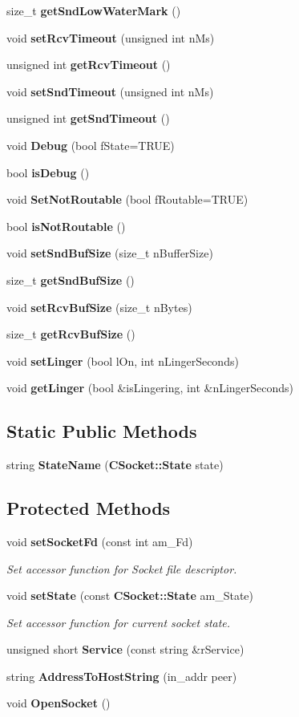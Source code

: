 \begin{CompactItemize}
size\_\-t {\bf get\-Snd\-Low\-Water\-Mark} ()
\item 
void {\bf set\-Rcv\-Timeout} (unsigned int n\-Ms)
\item 
unsigned int {\bf get\-Rcv\-Timeout} ()
\item 
void {\bf set\-Snd\-Timeout} (unsigned int n\-Ms)
\item 
unsigned int {\bf get\-Snd\-Timeout} ()
\item 
void {\bf Debug} (bool f\-State=TRUE)
\item 
bool {\bf is\-Debug} ()
\item 
void {\bf Set\-Not\-Routable} (bool f\-Routable=TRUE)
\item 
bool {\bf is\-Not\-Routable} ()
\item 
void {\bf set\-Snd\-Buf\-Size} (size\_\-t n\-Buffer\-Size)
\item 
size\_\-t {\bf get\-Snd\-Buf\-Size} ()
\item 
void {\bf set\-Rcv\-Buf\-Size} (size\_\-t n\-Bytes)
\item 
size\_\-t {\bf get\-Rcv\-Buf\-Size} ()
\item 
void {\bf set\-Linger} (bool l\-On, int n\-Linger\-Seconds)
\item 
void {\bf get\-Linger} (bool \&is\-Lingering, int \&n\-Linger\-Seconds)
\end{CompactItemize}
\subsection*{Static Public Methods}
\begin{CompactItemize}
\item 
string {\bf State\-Name} ({\bf CSocket::State} state)
\end{CompactItemize}
\subsection*{Protected Methods}
\begin{CompactItemize}
\item 
void {\bf set\-Socket\-Fd} (const int am\_\-Fd)
\begin{CompactList}\small\item\em Set accessor function for Socket file descriptor.\item\end{CompactList}\item 
void {\bf set\-State} (const {\bf CSocket::State} am\_\-State)
\begin{CompactList}\small\item\em Set accessor function for current socket state.\item\end{CompactList}\item 
unsigned short {\bf Service} (const string \&r\-Service)
\item 
string {\bf Address\-To\-Host\-String} (in\_\-addr peer)
\item 
void {\bf Open\-Socket} ()
\end{CompactItemize}

